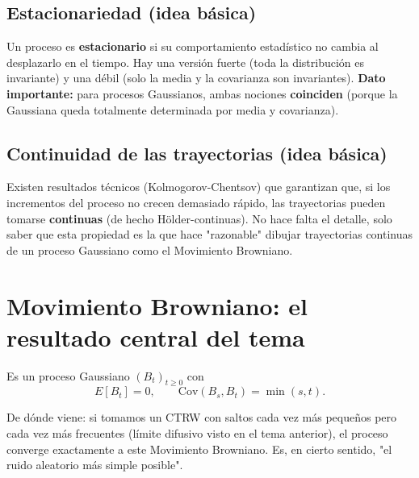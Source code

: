 \documentclass[10pt]{book}
\begin{document}
\subsection*{Estacionariedad (idea básica)}
Un proceso es \textbf{estacionario} si su comportamiento estadístico no cambia al desplazarlo en el tiempo. Hay una versión fuerte (toda la distribución es invariante) y una débil (solo la media y la covarianza son invariantes). \textbf{Dato importante:} para procesos Gaussianos, ambas nociones \textbf{coinciden} (porque la Gaussiana queda totalmente determinada por media y covarianza).

\subsection*{Continuidad de las trayectorias (idea básica)}
Existen resultados técnicos (Kolmogorov-Chentsov) que garantizan que, si los incrementos del proceso no crecen demasiado rápido, las trayectorias pueden tomarse \textbf{continuas} (de hecho Hölder-continuas). No hace falta el detalle, solo saber que esta propiedad es la que hace "razonable" dibujar trayectorias continuas de un proceso Gaussiano como el Movimiento Browniano.

\section{Movimiento Browniano: el resultado central del tema}

\begin{definicion}
Es un proceso Gaussiano $(B_t)_{t\ge0}$ con
\begin{equation*}
    E[B_t]=0, \qquad \mathrm{Cov}(B_s,B_t) = \min(s,t).
\end{equation*}
\end{definicion}

\begin{observacion}
De dónde viene: si tomamos un CTRW con saltos cada vez más pequeños pero cada vez más frecuentes (límite difusivo visto en el tema anterior), el proceso converge exactamente a este Movimiento Browniano. Es, en cierto sentido, "el ruido aleatorio más simple posible".
\end{observacion}
\end{document}
